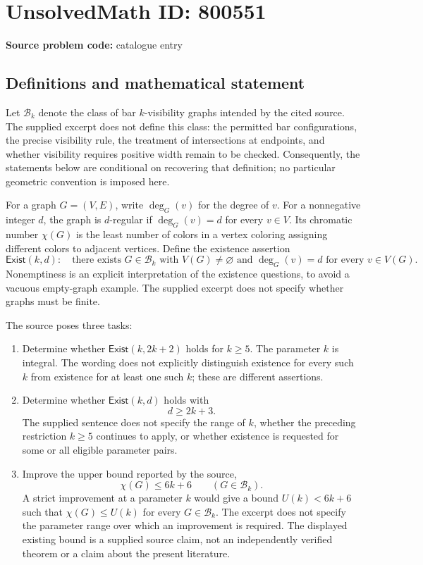 \documentclass[11pt]{article}
\begin{document}
\section*{UnsolvedMath ID: 800551}
\textbf{Source problem code:} catalogue entry
\subsection{Definitions and mathematical statement}
Let \(\mathcal B_k\) denote the class of bar \(k\)-visibility graphs intended by the cited source. The supplied excerpt does not define this class: the permitted bar configurations, the precise visibility rule, the treatment of intersections at endpoints, and whether visibility requires positive width remain to be checked. Consequently, the statements below are conditional on recovering that definition; no particular geometric convention is imposed here.

For a graph \(G=(V,E)\), write \(\deg_G(v)\) for the degree of \(v\). For a nonnegative integer \(d\), the graph is \(d\)-regular if \(\deg_G(v)=d\) for every \(v\in V\). Its chromatic number \(\chi(G)\) is the least number of colors in a vertex coloring assigning different colors to adjacent vertices. Define the existence assertion
\[
\mathsf{Exist}(k,d):\quad \text{there exists }G\in\mathcal B_k\text{ with }V(G)\ne\varnothing\text{ and }\deg_G(v)=d\text{ for every }v\in V(G).
\]
Nonemptiness is an explicit interpretation of the existence questions, to avoid a vacuous empty-graph example. The supplied excerpt does not specify whether graphs must be finite.

The source poses three tasks:
\begin{enumerate}
\item Determine whether \(\mathsf{Exist}(k,2k+2)\) holds for \(k\geq5\). The parameter \(k\) is integral. The wording does not explicitly distinguish existence for every such \(k\) from existence for at least one such \(k\); these are different assertions.
\item Determine whether \(\mathsf{Exist}(k,d)\) holds with
\[
 d\geq2k+3.
\]
The supplied sentence does not specify the range of \(k\), whether the preceding restriction \(k\geq5\) continues to apply, or whether existence is requested for some or all eligible parameter pairs.
\item Improve the upper bound reported by the source,
\[
\chi(G)\leq6k+6\qquad(G\in\mathcal B_k).
\]
A strict improvement at a parameter \(k\) would give a bound \(U(k)<6k+6\) such that \(\chi(G)\leq U(k)\) for every \(G\in\mathcal B_k\). The excerpt does not specify the parameter range over which an improvement is required. The displayed existing bound is a supplied source claim, not an independently verified theorem or a claim about the present literature.
\end{enumerate}
\end{document}

